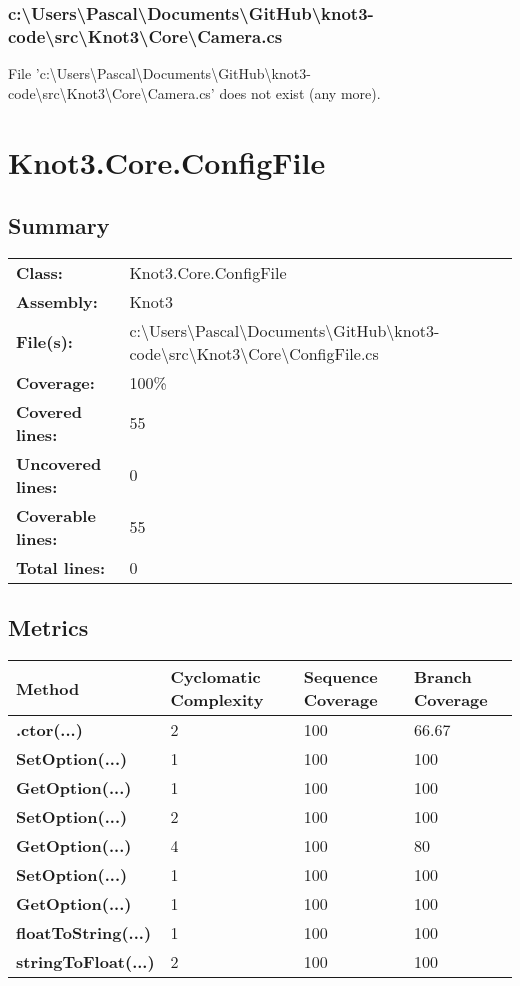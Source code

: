 \documentclass[a4paper,10pt]{article}
\begin{document}
\subsubsection{c:\textbackslash Users\textbackslash Pascal\textbackslash Documents\textbackslash GitHub\textbackslash knot3-code\textbackslash src\textbackslash Knot3\textbackslash Core\textbackslash Camera.cs}
 File 'c:\textbackslash Users\textbackslash Pascal\textbackslash Documents\textbackslash GitHub\textbackslash knot3-code\textbackslash src\textbackslash Knot3\textbackslash Core\textbackslash Camera.cs' does not exist (any more).
\newpage
\section{Knot3.Core.ConfigFile}
\subsection{Summary}
\begin{longtable}[l]{ll}
\textbf{Class:} & Knot3.Core.ConfigFile\\
\textbf{Assembly:} & Knot3\\
\textbf{File(s):} & \begin{minipage}[t]{12cm}{c:\textbackslash Users\textbackslash Pascal\textbackslash Documents\textbackslash GitHub\textbackslash knot3-code\textbackslash src\textbackslash Knot3\textbackslash Core\textbackslash ConfigFile.cs}\end{minipage} \\
\textbf{Coverage:} & 100\%\\
\textbf{Covered lines:} & 55\\
\textbf{Uncovered lines:} & 0\\
\textbf{Coverable lines:} & 55\\
\textbf{Total lines:} & 0\\
\end{longtable}
\subsection{Metrics}
\begin{longtable}[l]{|l|l|l|l|}
\hline
\textbf{Method} & \textbf{Cyclomatic Complexity} & \textbf{Sequence Coverage} & \textbf{Branch Coverage}\\
\hline
\textbf{.ctor(...)} & 2 & 100 & 66.67\\
\hline
\textbf{SetOption(...)} & 1 & 100 & 100\\
\hline
\textbf{GetOption(...)} & 1 & 100 & 100\\
\hline
\textbf{SetOption(...)} & 2 & 100 & 100\\
\hline
\textbf{GetOption(...)} & 4 & 100 & 80\\
\hline
\textbf{SetOption(...)} & 1 & 100 & 100\\
\hline
\textbf{GetOption(...)} & 1 & 100 & 100\\
\hline
\textbf{floatToString(...)} & 1 & 100 & 100\\
\hline
\textbf{stringToFloat(...)} & 2 & 100 & 100\\
\hline
\end{longtable}
\end{document}
